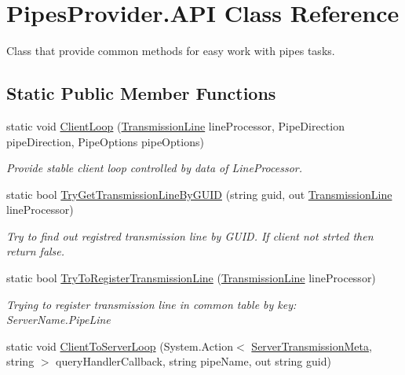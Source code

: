 \hypertarget{class_pipes_provider_1_1_a_p_i}{}\section{Pipes\+Provider.\+A\+PI Class Reference}
\label{class_pipes_provider_1_1_a_p_i}


Class that provide common methods for easy work with pipes\textquotesingle{} tasks.  


\subsection*{Static Public Member Functions}
\begin{DoxyCompactItemize}
\item 
static void \mbox{\hyperlink{class_pipes_provider_1_1_a_p_i_aaccf777b3b489b550739dd8adcf4a1d3}{Client\+Loop}} (\mbox{\hyperlink{class_pipes_provider_1_1_transmission_line}{Transmission\+Line}} line\+Processor, Pipe\+Direction pipe\+Direction, Pipe\+Options pipe\+Options)
\begin{DoxyCompactList}\small\item\em Provide stable client loop controlled by data of Line\+Processor. \end{DoxyCompactList}\item 
static bool \mbox{\hyperlink{class_pipes_provider_1_1_a_p_i_ae1abc16273a4b459fdbf63e68c44d11f}{Try\+Get\+Transmission\+Line\+By\+G\+U\+ID}} (string guid, out \mbox{\hyperlink{class_pipes_provider_1_1_transmission_line}{Transmission\+Line}} line\+Processor)
\begin{DoxyCompactList}\small\item\em Try to find out registred transmission line by G\+U\+ID. If client not strted then return false. \end{DoxyCompactList}\item 
static bool \mbox{\hyperlink{class_pipes_provider_1_1_a_p_i_a39e17f30d2ee8c716efeb92f947fb72e}{Try\+To\+Register\+Transmission\+Line}} (\mbox{\hyperlink{class_pipes_provider_1_1_transmission_line}{Transmission\+Line}} line\+Processor)
\begin{DoxyCompactList}\small\item\em Trying to register transmission line in common table by key\+: Server\+Name.\+Pipe\+Line \end{DoxyCompactList}\item 
static void \mbox{\hyperlink{class_pipes_provider_1_1_a_p_i_a99feebefadd9a40a3c1fa7175324d950}{Client\+To\+Server\+Loop}} (System.\+Action$<$ \mbox{\hyperlink{class_pipes_provider_1_1_server_transmission_meta}{Server\+Transmission\+Meta}}, string $>$ query\+Handler\+Callback, string pipe\+Name, out string guid)

\end{DoxyCompactItemize}
